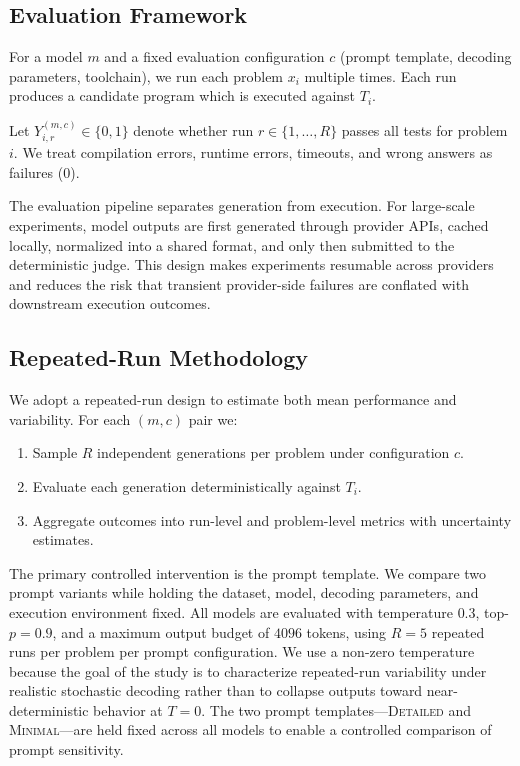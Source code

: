 \documentclass[11pt]{article}
\begin{document}
\subsection{Evaluation Framework}
For a model $m$ and a fixed evaluation configuration $c$ (prompt template, decoding parameters, toolchain), we run each problem $x_i$ multiple times. Each run produces a candidate program which is executed against $T_i$.

Let $Y_{i,r}^{(m,c)} \in \{0,1\}$ denote whether run $r \in \{1,\dots,R\}$ passes all tests for problem $i$. We treat compilation errors, runtime errors, timeouts, and wrong answers as failures ($0$).

The evaluation pipeline separates generation from execution. For large-scale experiments, model outputs are first generated through provider APIs, cached locally, normalized into a shared format, and only then submitted to the deterministic judge. This design makes experiments resumable across providers and reduces the risk that transient provider-side failures are conflated with downstream execution outcomes.

\subsection{Repeated-Run Methodology}
We adopt a repeated-run design to estimate both mean performance and variability. For each $(m,c)$ pair we:
\begin{enumerate}
  \item Sample $R$ independent generations per problem under configuration $c$.
  \item Evaluate each generation deterministically against $T_i$.
  \item Aggregate outcomes into run-level and problem-level metrics with uncertainty estimates.
\end{enumerate}

The primary controlled intervention is the prompt template. We compare two prompt variants while holding the dataset, model, decoding parameters, and execution environment fixed. All models are evaluated with temperature $0.3$, top-$p=0.9$, and a maximum output budget of $4096$ tokens, using $R=5$ repeated runs per problem per prompt configuration. We use a non-zero temperature because the goal of the study is to characterize repeated-run variability under realistic stochastic decoding rather than to collapse outputs toward near-deterministic behavior at $T=0$. The two prompt templates---\textsc{Detailed} and \textsc{Minimal}---are held fixed across all models to enable a controlled comparison of prompt sensitivity.
\end{document}

